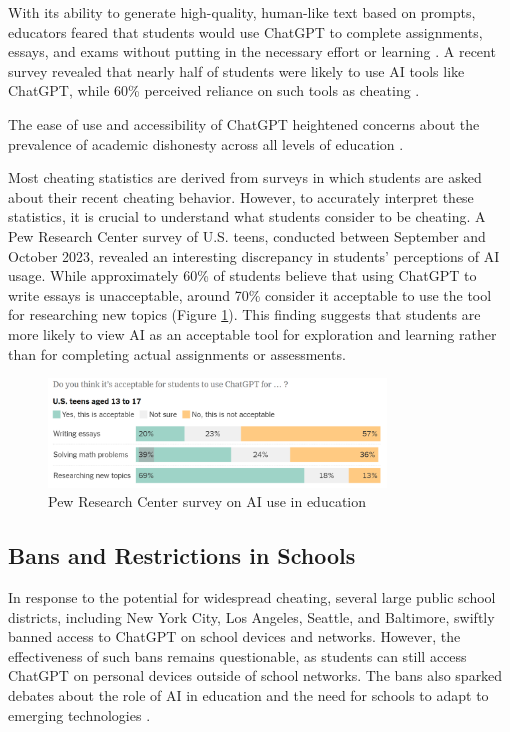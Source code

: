\documentclass{article}
\begin{document}
With its ability to generate high-quality, human-like text
based on prompts, educators feared that students would use
ChatGPT to complete assignments, essays, and exams without
putting in the necessary effort or learning
\cite{missouri2023chatgpt} \cite{reddit_chatgpt_academic_purposes}
\cite{theweek_ai_schools}.
A recent survey revealed that nearly half of students were likely
to use AI tools like ChatGPT, while 60\% perceived reliance on
such tools as cheating \cite{missouri2023chatgpt}.

The ease of use and accessibility of ChatGPT heightened concerns
about the prevalence of academic dishonesty across all levels of
education \cite{shiri2023chatgpt}\cite{reddit_chatgpt_academic_purposes}.

Most cheating statistics are derived from surveys in which students
are asked about their recent cheating behavior.
However, to accurately interpret these statistics, it is crucial
to understand what students consider to be cheating.
A Pew Research Center survey of U.S. teens, conducted between
September and October 2023, revealed an interesting discrepancy
in students' perceptions of AI usage. While approximately 60\%
of students believe that using ChatGPT to write essays is unacceptable, around 70\%
consider it acceptable to use the tool for researching new topics (Figure \ref{fig:chatgpt_acceptable_usecases}).
This finding suggests that students are more likely to view AI
as an acceptable tool for exploration and learning rather than for
completing actual assignments or assessments.

\begin{figure}[h]
    \centering
    \includegraphics[width=0.8\textwidth]{images/chatgpt_acceptable_usecases.png}
    \caption{Pew Research Center survey on AI use in education \cite{nytimes_chatbot_cheating}}
    \label{fig:chatgpt_acceptable_usecases}
\end{figure}

\subsection{Bans and Restrictions in Schools}
In response to the potential for widespread cheating,
several large public school districts, including New York City,
Los Angeles, Seattle, and Baltimore, swiftly banned access to
ChatGPT on school devices and networks.
However, the effectiveness of such bans remains questionable,
as students can still access ChatGPT on personal devices outside
of school networks.
The bans also sparked debates about the role of AI
in education and the need for schools to adapt to emerging
technologies
\cite{missouri2023chatgpt} \cite{reddit_chatgpt_academic_purposes}.
\end{document}
